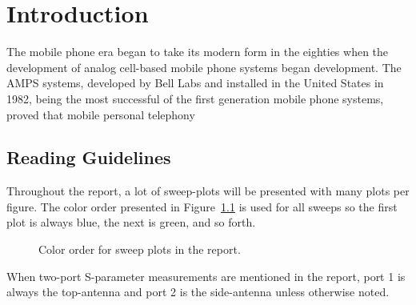 \chapter{Introduction}
\label{cha:intro}

The mobile phone era began to take its modern form in the eighties when the development of analog cell-based mobile phone systems began development. The AMPS systems, developed by Bell Labs and installed in the United States in 1982, being the most successful of the first generation mobile phone systems, proved that mobile personal telephony 










\section{Reading Guidelines}
Throughout the report, a lot of sweep-plots will be presented with many plots per figure. The color order presented in Figure~\ref{fig:colororder} is used for all sweeps so the first plot is always blue, the next is green, and so forth.

\begin{figure}[htbp]
    \centering
    \caption{Color order for sweep plots in the report.}
    \label{fig:colororder}
\end{figure}

When two-port S-parameter measurements are mentioned in the report, port 1 is always the top-antenna and port 2 is the side-antenna unless otherwise noted.

